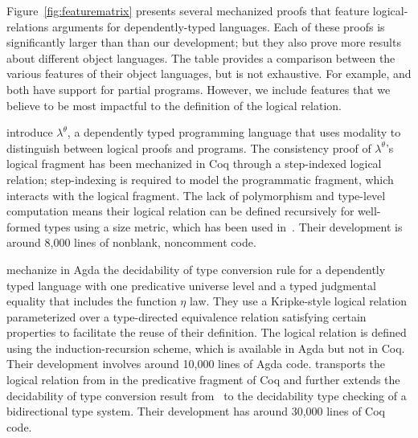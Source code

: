 \documentclass[\ifpublic nolinenum\else\fi,online,OA]{jfp}
\newcommand{\scw}[1]{}
\newcommand{\yl}[1]{}
\theoremstyle{definition}
\begin{document}
\scw{Should we add a column for whether their logical relation is
  unary or binary?}\yl{Technically a Kripke-style model has the
  context as an argument to the logrel, too. By binary, we are really
  talking about whether the interpreted set is binary or not. I think
  it is tricky to explain what we actually mean. }
\scw{I don't think it is that trick}
Figure~\ref{fig:featurematrix} presents several mechanized proofs
that feature logical-relations arguments for dependently-typed languages.
Each of these proofs is significantly larger than than our development; but they
also prove more results about different object languages.%
The table provides a comparison between the various features of their
object languages, but is not exhaustive. For example,
\citet{casinghino:combining-proofs-programs} and
\citet{anand2014towards} both have support for partial
programs. However, we include features that we believe to be most
impactful to the definition of the logical relation.

\citet{casinghino:combining-proofs-programs} introduce $\lambda^\theta$, a dependently typed
programming language that uses modality to distinguish between logical
proofs and programs. %
The consistency proof of $\lambda^\theta$'s logical fragment has been
mechanized in Coq through a step-indexed logical relation;
step-indexing is required to model the programmatic fragment, which
interacts with the logical fragment.
The lack of polymorphism and type-level computation means their
logical relation can be defined recursively for well-formed types using
a size metric, which has been used in~\citet{liu2023dependently}.
Their development is around 8,000 lines of nonblank, noncomment code.

\citet{decagda} mechanize in Agda the decidability of type
conversion rule for a dependently typed language with one predicative
universe level and a typed judgmental equality that includes the function
$\eta$ law. They
use a Kripke-style logical relation parameterized over a
type-directed equivalence relation satisfying certain
properties to facilitate the reuse of their definition. The
logical relation is defined using the induction-recursion scheme,
which is available in Agda but not in Coq. Their development involves
around 10,000 lines of Agda code.
\citet{martin-lof-a-la-coq} transports the logical relation
from \citet{decagda} in the predicative fragment of Coq and further
extends the decidability of type conversion result
from~\citet{decagda} to the decidability type checking of a
bidirectional type system. Their development has around
30,000 lines of Coq code.
\end{document}

